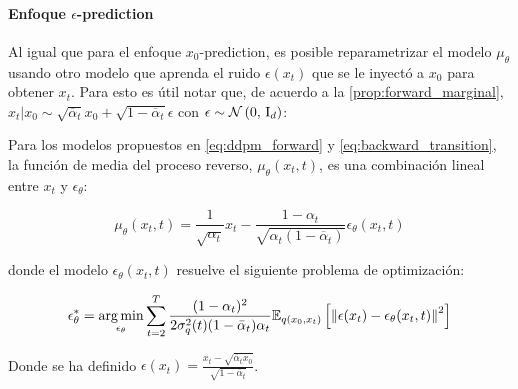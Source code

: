 \paragraph{Enfoque \texorpdfstring{$\epsilon$}{epsilon}-prediction}

Al igual que para el enfoque $x_0$-prediction, es posible reparametrizar el modelo $\mu_\theta$ usando otro modelo que aprenda el ruido $\epsilon(x_t)$ que se le inyectó a $x_0$ para obtener $x_t$. Para esto es útil notar que, de acuerdo a la \autoref{prop:forward_marginal}, $x_t|x_0\sim \sqrt{\overline{\alpha}_t}x_0 + \sqrt{1-\overline{\alpha}_t}\epsilon$ con $\epsilon\sim\mathcal{N}\left(0,\,\operatorname{I}_{d}\right)$:

\begin{prop}
    \label{prop:epsilon_prediction}

    Para los modelos propuestos en \eqref{eq:ddpm_forward} y \eqref{eq:backward_transition}, la función de media del proceso reverso, $\mu_\theta(x_t,t)$, es una combinación lineal entre $x_t$ y $\epsilon_\theta$:

    \begin{equation}
        \label{eq:ddpm_epsilon_prediction}
        \mu_\theta(x_t,t) = \frac{1}{\sqrt{\alpha_t}}x_t - \frac{1-\alpha_t}{\sqrt{\alpha_t(1-\overline{\alpha}_t)}}\epsilon_\theta(x_t,t)
    \end{equation}

    donde el modelo $\epsilon_\theta(x_t,t)$ resuelve el siguiente problema de optimización:

    \begin{equation*}
        \epsilon_\theta^*=\operatorname*{arg\,min}_{\epsilon_\theta} \sum_{t=2}^T \frac{(1-\alpha_t)^2}{2\sigma_q^2(t)(1-\bar\alpha_t)\alpha_t} \mathbb{E}_{q(x_0,x_t)}\left[ \left\lVert \epsilon(x_t) - \epsilon_\theta(x_t,t) \right\rVert^2\right]
    \end{equation*}

    Donde se ha definido $\epsilon(x_t) = \frac{x_t-\sqrt{\overline{\alpha}_t x_0}}{\sqrt{1-\overline{\alpha}_t}}$.
\end{prop}

